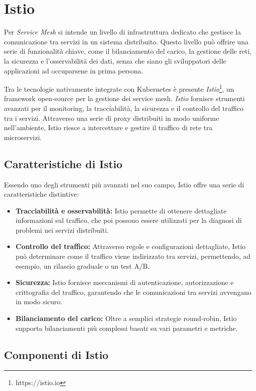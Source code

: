 \section{Istio}
 Per \textit{Service Mesh} si intende un livello di infrastruttura dedicato che gestisce la comunicazione tra servizi in un sistema distribuito. Questo livello può offrire una serie di funzionalità chiave, come il bilanciamento del carico, la gestione delle reti, la sicurezza e l'osservabilità dei dati, senza che siano gli sviluppatori delle applicazioni ad occuparsene in prima persona.

Tra le tecnologie nativamente integrate con Kubernetes è presente \textit{Istio}\footnote{https://istio.io}, un framework open-source per la gestione dei service mesh. \textit{Istio} fornisce strumenti avanzati per il monitoring, la tracciabilità, la sicurezza e il controllo del traffico tra i servizi. Attraverso una serie di proxy distribuiti in modo uniforme nell'ambiente, Istio riesce a intercettare e gestire il traffico di rete tra microservizi.

\subsection{Caratteristiche di Istio}
Essendo uno degli strumenti più avanzati nel suo campo, Istio offre una serie di caratteristiche distintive:

\begin{itemize}
\item \textbf{Tracciabilità e osservabilità:} Istio permette di ottenere dettagliate informazioni sul traffico, che poi possono essere utilizzati per la diagnosi di problemi nei servizi distribuiti.
\item \textbf{Controllo del traffico:} Attraverso regole e configurazioni dettagliate, Istio può determinare come il traffico viene indirizzato tra servizi, permettendo, ad esempio, un rilascio graduale o un test A/B.
\item \textbf{Sicurezza:} Istio fornisce meccanismi di autenticazione, autorizzazione e crittografia del traffico, garantendo che le comunicazioni tra servizi avvengano in modo sicuro.
\item \textbf{Bilanciamento del carico:} Oltre a semplici strategie round-robin, Istio supporta bilanciamenti più complessi basati su vari parametri e metriche.
\end{itemize}

\subsection{Componenti di Istio}

